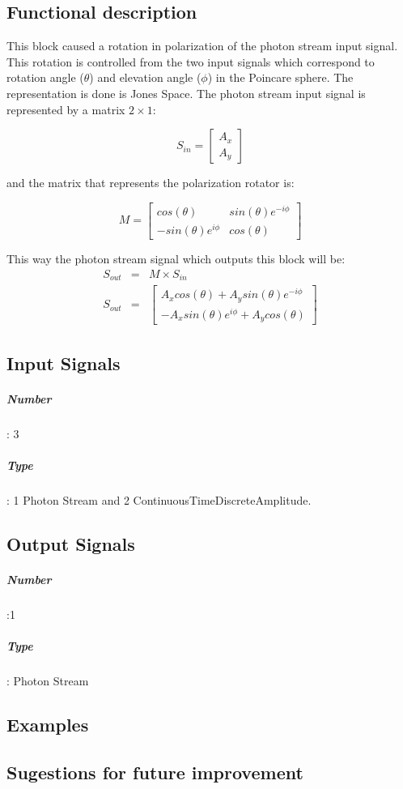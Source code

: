 \subsection*{Functional description}
This block caused a rotation in polarization of the photon stream input signal. This rotation is controlled from the two input signals which correspond to rotation angle ($\theta$) and elevation angle ($\phi$) in the Poincare sphere. The representation is done is Jones Space. The photon stream input signal is represented by a matrix $2 \times 1$:

\begin{equation}\label{eq:inputphoton}
  S_{in}=\left[
  \begin{array}{c}
    A_x \\
    A_y
  \end{array}
  \right]
\end{equation}

and the matrix that represents the polarization rotator is:

\begin{equation}\label{eq:rotatormatrix}
  M=\left[
  \begin{array}{cc}
    cos(\theta) & sin(\theta)e^{-i\phi} \\
    -sin(\theta)e^{i\phi} & cos(\theta)
  \end{array}
  \right]
\end{equation}

This way the photon stream signal which outputs this block will be:
\begin{eqnarray}
 \nonumber %
    S_{out} &=& M \times S_{in} \\
    S_{out} &=&\left[
  \begin{array}{c}
    A_{x}cos(\theta)+A_{y}sin(\theta)e^{-i\phi} \\
    -A_{x}sin(\theta)e^{i\phi}+A_{y}cos(\theta)
  \end{array}
  \right]
\end{eqnarray}


\subsection*{Input Signals}
\subparagraph*{Number}: 3
\subparagraph*{Type}: 1 Photon Stream and 2 ContinuousTimeDiscreteAmplitude.

\subsection*{Output Signals}
\subparagraph*{Number}:1
\subparagraph*{Type}: Photon Stream

\subsection*{Examples}


\subsection*{Sugestions for future improvement} 